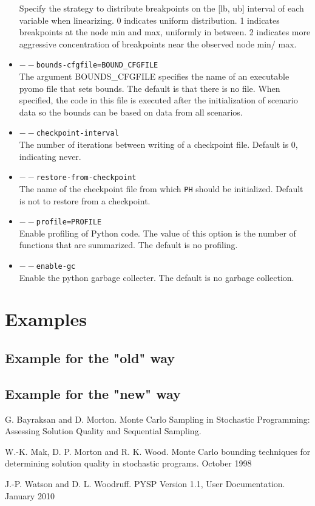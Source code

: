 \documentclass[a4paper]{article}
\begin{document}
\begin{itemize}
	Specify the strategy to distribute breakpoints on the [lb, ub] interval of each variable when linearizing. 0 indicates uniform distribution. 1 indicates breakpoints at the node min and max, uniformly in between. 2 indicates more aggressive concentration of breakpoints near the observed node min/ max. 
	\item \texttt{$--$bounds-cfgfile=BOUND\_CFGFILE}\\
	The argument BOUNDS\_CFGFILE specifies the name of an executable pyomo file that sets bounds. The default is that there is no file. When specified, the code in this file is executed after the initialization of scenario data so the bounds can be based on data from all scenarios. 
	\item \texttt{$--$checkpoint-interval}\\
	The number of iterations between writing of a checkpoint file. Default is 0, indicating never. 
	\item \texttt{$--$restore-from-checkpoint}\\
	The name of the checkpoint file from which \texttt{PH} should be initialized. Default is not to restore from a checkpoint. 
	\item \texttt{$--$profile=PROFILE}\\
	Enable profiling of Python code. The value of this option is the number of functions that are summarized. The default is no profiling. 
	\item \texttt{$--$enable-gc}\\
	Enable the python garbage collecter. The default is no garbage collection. 
\end{itemize}



\section{Examples}
\subsection{Example for the "old" way}
\subsection{Example for the "new" way}





\begin{thebibliography}{------}

	G. Bayraksan and D. Morton.
  {Monte Carlo Sampling in Stochastic Programming: Assessing Solution Quality and Sequential Sampling}.

	W.-K. Mak, D. P. Morton and R. K. Wood.
  {Monte Carlo bounding techniques for determining solution quality in stochastic programs}.
	October 1998

	J.-P. Watson and D. L. Woodruff.
  {PYSP Version 1.1, User Documentation}.
	January 2010




\end{thebibliography}
\end{document}
